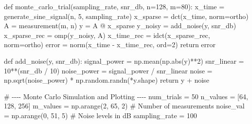 \documentclass[
  letterpaper,
  DIV=11,
  numbers=noendperiod]{scrartcl}
\newenvironment{Shaded}{\begin{snugshade}}{\end{snugshade}}
\newcommand{\BuiltInTok}[1]{\textcolor[rgb]{0.40,0.85,0.94}{#1}}
\newcommand{\CommentTok}[1]{\textcolor[rgb]{0.46,0.44,0.37}{#1}}
\newcommand{\ControlFlowTok}[1]{\textcolor[rgb]{0.98,0.15,0.45}{#1}}
\newcommand{\DecValTok}[1]{\textcolor[rgb]{0.68,0.51,1.00}{#1}}
\newcommand{\KeywordTok}[1]{\textcolor[rgb]{0.98,0.15,0.45}{#1}}
\newcommand{\NormalTok}[1]{\textcolor[rgb]{0.97,0.97,0.95}{#1}}
\newcommand{\OperatorTok}[1]{\textcolor[rgb]{0.97,0.97,0.95}{#1}}
\newcommand{\StringTok}[1]{\textcolor[rgb]{0.90,0.86,0.45}{#1}}
\begin{document}
\begin{Shaded}
\begin{Highlighting}[]
\KeywordTok{def}\NormalTok{ monte\_carlo\_trial(sampling\_rate, snr\_db, n}\OperatorTok{=}\DecValTok{128}\NormalTok{, m}\OperatorTok{=}\DecValTok{80}\NormalTok{):}
\NormalTok{    x\_time }\OperatorTok{=}\NormalTok{ generate\_sine\_signal(n, }\DecValTok{5}\NormalTok{, sampling\_rate)}
\NormalTok{    x\_sparse }\OperatorTok{=}\NormalTok{ dct(x\_time, norm}\OperatorTok{=}\StringTok{\textquotesingle{}ortho\textquotesingle{}}\NormalTok{)}
\NormalTok{    A }\OperatorTok{=}\NormalTok{ measurement(m, n)}
\NormalTok{    y }\OperatorTok{=}\NormalTok{ A }\OperatorTok{@}\NormalTok{ x\_sparse}
\NormalTok{    y\_noisy }\OperatorTok{=}\NormalTok{ add\_noise(y, snr\_db)}
\NormalTok{    x\_sparse\_rec }\OperatorTok{=}\NormalTok{ omp(y\_noisy, A)}
\NormalTok{    x\_time\_rec }\OperatorTok{=}\NormalTok{ idct(x\_sparse\_rec, norm}\OperatorTok{=}\StringTok{\textquotesingle{}ortho\textquotesingle{}}\NormalTok{)}
\NormalTok{    error }\OperatorTok{=}\NormalTok{ norm(x\_time }\OperatorTok{{-}}\NormalTok{ x\_time\_rec, }\BuiltInTok{ord}\OperatorTok{=}\DecValTok{2}\NormalTok{)}
    \ControlFlowTok{return}\NormalTok{ error}

\KeywordTok{def}\NormalTok{ add\_noise(y, snr\_db):}
\NormalTok{    signal\_power }\OperatorTok{=}\NormalTok{ np.mean(np.}\BuiltInTok{abs}\NormalTok{(y)}\OperatorTok{**}\DecValTok{2}\NormalTok{)}
\NormalTok{    snr\_linear }\OperatorTok{=} \DecValTok{10}\OperatorTok{**}\NormalTok{(snr\_db }\OperatorTok{/} \DecValTok{10}\NormalTok{)}
\NormalTok{    noise\_power }\OperatorTok{=}\NormalTok{ signal\_power }\OperatorTok{/}\NormalTok{ snr\_linear}
\NormalTok{    noise }\OperatorTok{=}\NormalTok{ np.sqrt(noise\_power) }\OperatorTok{*}\NormalTok{ np.random.randn(}\OperatorTok{*}\NormalTok{y.shape)}
    \ControlFlowTok{return}\NormalTok{ y }\OperatorTok{+}\NormalTok{ noise}
    
\CommentTok{\# {-}{-}{-}{-} Monte Carlo Simulation and Plotting {-}{-}{-}{-}}
\NormalTok{num\_trials }\OperatorTok{=} \DecValTok{50}
\NormalTok{n\_values }\OperatorTok{=}\NormalTok{ [}\DecValTok{64}\NormalTok{, }\DecValTok{128}\NormalTok{, }\DecValTok{256}\NormalTok{]}
\NormalTok{m\_values }\OperatorTok{=}\NormalTok{ np.arange(}\DecValTok{2}\NormalTok{, }\DecValTok{65}\NormalTok{, }\DecValTok{2}\NormalTok{)  }\CommentTok{\# Number of measurements}
\NormalTok{noise\_val }\OperatorTok{=}\NormalTok{ np.arange(}\DecValTok{0}\NormalTok{, }\DecValTok{51}\NormalTok{, }\DecValTok{5}\NormalTok{)  }\CommentTok{\# Noise levels in dB}
\NormalTok{sampling\_rate }\OperatorTok{=} \DecValTok{100}


\end{Highlighting}
\end{Shaded}
\end{document}
